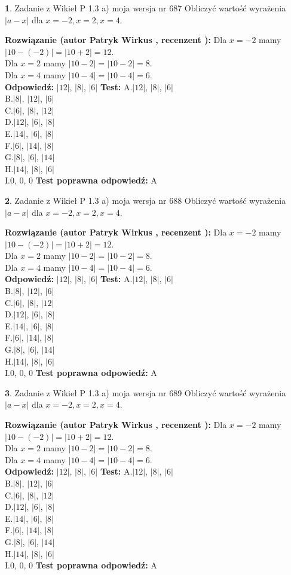 \documentclass[12pt, a4paper]{article}
\theoremstyle{definition} %
\newtheorem{zad}{}
\newcommand{\zadStart}[1]{\begin{zad}#1\newline}
\newcommand{\zadStop}{\end{zad}}
\newcommand{\rozwStart}[2]{\noindent \textbf{Rozwiązanie (autor #1 , recenzent #2): }\newline}
\newcommand{\rozwStop}{\newline}
\newcommand{\odpStart}{\noindent \textbf{Odpowiedź:}\newline}
\newcommand{\odpStop}{\newline}
\newcommand{\testStart}{\noindent \textbf{Test:}\newline}
\newcommand{\testStop}{\newline}
\newcommand{\kluczStart}{\noindent \textbf{Test poprawna odpowiedź:}\newline}
\newcommand{\kluczStop}{\newline}
\begin{document}
\zadStart{Zadanie z Wikieł P 1.3 a) moja wersja nr 687}
Obliczyć wartość wyrażenia $|a - x|$ dla $x=-2,x=2,x=4$.
\zadStop
\rozwStart{Patryk Wirkus}{}
Dla $x = -2$ mamy $|10 - (-2)| = |10 + 2| = 12$.\\
Dla $x = 2$ mamy $|10 - 2| = |10 - 2| = 8$.\\
Dla $x = 4$ mamy $|10 - 4| = |10 - 4| = 6$.\\
\rozwStop
\odpStart
$|12|$, $|8|$, $|6|$
\odpStop
\testStart
A.$|12|$, $|8|$, $|6|$\\
B.$|8|$, $|12|$, $|6|$\\
C.$|6|$, $|8|$, $|12|$\\
D.$|12|$, $|6|$, $|8|$\\
E.$|14|$, $|6|$, $|8|$\\
F.$|6|$, $|14|$, $|8|$\\
G.$|8|$, $|6|$, $|14|$\\
H.$|14|$, $|8|$, $|6|$\\
I.$0$, $0$, $0$
\testStop
\kluczStart
A
\kluczStop



\zadStart{Zadanie z Wikieł P 1.3 a) moja wersja nr 688}
Obliczyć wartość wyrażenia $|a - x|$ dla $x=-2,x=2,x=4$.
\zadStop
\rozwStart{Patryk Wirkus}{}
Dla $x = -2$ mamy $|10 - (-2)| = |10 + 2| = 12$.\\
Dla $x = 2$ mamy $|10 - 2| = |10 - 2| = 8$.\\
Dla $x = 4$ mamy $|10 - 4| = |10 - 4| = 6$.\\
\rozwStop
\odpStart
$|12|$, $|8|$, $|6|$
\odpStop
\testStart
A.$|12|$, $|8|$, $|6|$\\
B.$|8|$, $|12|$, $|6|$\\
C.$|6|$, $|8|$, $|12|$\\
D.$|12|$, $|6|$, $|8|$\\
E.$|14|$, $|6|$, $|8|$\\
F.$|6|$, $|14|$, $|8|$\\
G.$|8|$, $|6|$, $|14|$\\
H.$|14|$, $|8|$, $|6|$\\
I.$0$, $0$, $0$
\testStop
\kluczStart
A
\kluczStop



\zadStart{Zadanie z Wikieł P 1.3 a) moja wersja nr 689}
Obliczyć wartość wyrażenia $|a - x|$ dla $x=-2,x=2,x=4$.
\zadStop
\rozwStart{Patryk Wirkus}{}
Dla $x = -2$ mamy $|10 - (-2)| = |10 + 2| = 12$.\\
Dla $x = 2$ mamy $|10 - 2| = |10 - 2| = 8$.\\
Dla $x = 4$ mamy $|10 - 4| = |10 - 4| = 6$.\\
\rozwStop
\odpStart
$|12|$, $|8|$, $|6|$
\odpStop
\testStart
A.$|12|$, $|8|$, $|6|$\\
B.$|8|$, $|12|$, $|6|$\\
C.$|6|$, $|8|$, $|12|$\\
D.$|12|$, $|6|$, $|8|$\\
E.$|14|$, $|6|$, $|8|$\\
F.$|6|$, $|14|$, $|8|$\\
G.$|8|$, $|6|$, $|14|$\\
H.$|14|$, $|8|$, $|6|$\\
I.$0$, $0$, $0$
\testStop
\kluczStart
A
\kluczStop
\end{document}
